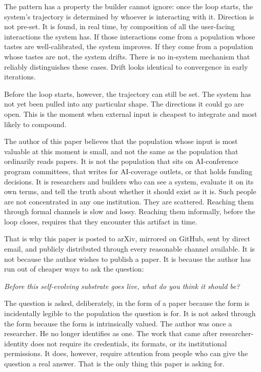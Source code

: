 \documentclass{article}
\begin{document}
The pattern has a property the builder cannot ignore: once the loop starts, the system's trajectory is determined by whoever is interacting with it. Direction is not pre-set. It is found, in real time, by composition of all the user-facing interactions the system has. If those interactions come from a population whose tastes are well-calibrated, the system improves. If they come from a population whose tastes are not, the system drifts. There is no in-system mechanism that reliably distinguishes these cases. Drift looks identical to convergence in early iterations.

Before the loop starts, however, the trajectory can still be set. The system has not yet been pulled into any particular shape. The directions it could go are open. This is the moment when external input is cheapest to integrate and most likely to compound.

The author of this paper believes that the population whose input is most valuable at this moment is small, and not the same as the population that ordinarily reads papers. It is not the population that sits on AI-conference program committees, that writes for AI-coverage outlets, or that holds funding decisions. It is researchers and builders who can see a system, evaluate it on its own terms, and tell the truth about whether it should exist as it is. Such people are not concentrated in any one institution. They are scattered. Reaching them through formal channels is slow and lossy. Reaching them informally, before the loop closes, requires that they encounter this artifact in time.

That is why this paper is posted to arXiv, mirrored on GitHub, sent by direct email, and publicly distributed through every reasonable channel available. It is not because the author wishes to publish a paper. It is because the author has run out of cheaper ways to ask the question:

\begin{displayquote}
\textit{Before this self-evolving substrate goes live, what do you think it should be?}
\end{displayquote}

The question is asked, deliberately, in the form of a paper because the form is incidentally legible to the population the question is for. It is not asked through the form because the form is intrinsically valued. The author was once a researcher. He no longer identifies as one. The work that came after researcher-identity does not require its credentials, its formats, or its institutional permissions. It does, however, require attention from people who can give the question a real answer. That is the only thing this paper is asking for.
\end{document}
